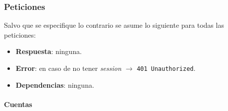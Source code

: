 \documentclass[../ei103948-project-documentation.tex]{subfiles}
\begin{document}
        \subsubsection{Peticiones}
        Salvo que se especifique lo contrario se asume lo siguiente para todas las peticiones:
                \begin{itemize}
                    \item \textbf{Respuesta}: ninguna.
                    \item \textbf{Error}: en caso de no tener \textit{session} $\rightarrow$ \texttt{401 Unauthorized}.
                    \item \textbf{Dependencias}: ninguna.
                \end{itemize}
            \paragraph{Cuentas}
\end{document}
